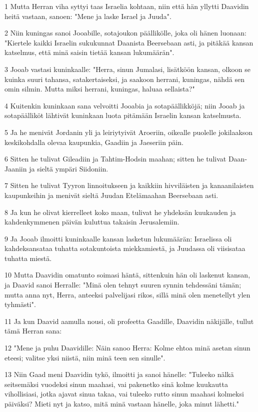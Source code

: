 \par 1 Mutta Herran viha syttyi taas Israelia kohtaan, niin että hän yllytti Daavidin heitä vastaan, sanoen: "Mene ja laske Israel ja Juuda".
\par 2 Niin kuningas sanoi Jooabille, sotajoukon päällikölle, joka oli hänen luonaan: "Kiertele kaikki Israelin sukukunnat Daanista Beersebaan asti, ja pitäkää kansan katselmus, että minä saisin tietää kansan lukumäärän".
\par 3 Jooab vastasi kuninkaalle: "Herra, sinun Jumalasi, lisätköön kansan, olkoon se kuinka suuri tahansa, satakertaiseksi, ja saakoon herrani, kuningas, nähdä sen omin silmin. Mutta miksi herrani, kuningas, haluaa sellaista?"
\par 4 Kuitenkin kuninkaan sana velvoitti Jooabia ja sotapäällikköjä; niin Jooab ja sotapäälliköt lähtivät kuninkaan luota pitämään Israelin kansan katselmusta.
\par 5 Ja he menivät Jordanin yli ja leiriytyivät Aroeriin, oikealle puolelle jokilaakson keskikohdalla olevaa kaupunkia, Gaadiin ja Jaeseriin päin.
\par 6 Sitten he tulivat Gileadiin ja Tahtim-Hodsin maahan; sitten he tulivat Daan-Jaaniin ja sieltä ympäri Siidoniin.
\par 7 Sitten he tulivat Tyyron linnoitukseen ja kaikkiin hivviläisten ja kanaanilaisten kaupunkeihin ja menivät sieltä Juudan Etelämaahan Beersebaan asti.
\par 8 Ja kun he olivat kierrelleet koko maan, tulivat he yhdeksän kuukauden ja kahdenkymmenen päivän kuluttua takaisin Jerusalemiin.
\par 9 Ja Jooab ilmoitti kuninkaalle kansan lasketun lukumäärän: Israelissa oli kahdeksansataa tuhatta sotakuntoista miekkamiestä, ja Juudassa oli viisisataa tuhatta miestä.
\par 10 Mutta Daavidin omatunto soimasi häntä, sittenkuin hän oli laskenut kansan, ja Daavid sanoi Herralle: "Minä olen tehnyt suuren synnin tehdessäni tämän; mutta anna nyt, Herra, anteeksi palvelijasi rikos, sillä minä olen menetellyt ylen tyhmästi".
\par 11 Ja kun Daavid aamulla nousi, oli profeetta Gaadille, Daavidin näkijälle, tullut tämä Herran sana:
\par 12 "Mene ja puhu Daavidille: Näin sanoo Herra: Kolme ehtoa minä asetan sinun eteesi; valitse yksi niistä, niin minä teen sen sinulle".
\par 13 Niin Gaad meni Daavidin tykö, ilmoitti ja sanoi hänelle: "Tuleeko nälkä seitsemäksi vuodeksi sinun maahasi, vai pakenetko sinä kolme kuukautta vihollisiasi, jotka ajavat sinua takaa, vai tuleeko rutto sinun maahasi kolmeksi päiväksi? Mieti nyt ja katso, mitä minä vastaan hänelle, joka minut lähetti."
